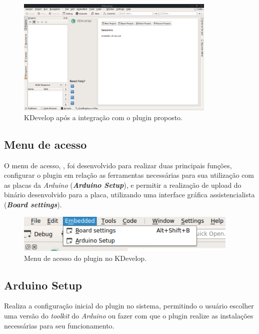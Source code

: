 \begin{figure}[!htb]
  \centering
  \caption[KDevelop]{KDevelop após a integração com o plugin proposto.}
  \label{fig:kdevelop}
  \includegraphics[width=0.85\textwidth]{figuras/kdevelop.png}
\end{figure}

\subsection{Menu de acesso}

O menu de acesso, , foi desenvolvido para realizar duas principais funções, configurar o plugin em relação as ferramentas necessárias para sua utilização com as placas da \textit{Arduino} (\textbf{\textit{Arduino Setup}}), e permitir a realização de upload do binário desenvolvido para a placa, utilizando uma interface gráfica assistencialista (\textbf{\textit{Board settings}}).

\begin{figure}[!htb]
  \centering
  \caption[Menu do plugin no KDevelop]{Menu de acesso do plugin no KDevelop.}
  \label{fig:kdevelopMenu}
  \includegraphics[width=0.95\textwidth]{figuras/kdevelopMenu.png}
\end{figure}

\subsection{Arduino Setup}

Realiza a configuração inicial do plugin no sistema, permitindo o usuário escolher uma versão do \textit{toolkit} do \textit{Arduino} ou fazer com que o plugin realize as instalações necessárias para seu funcionamento.

